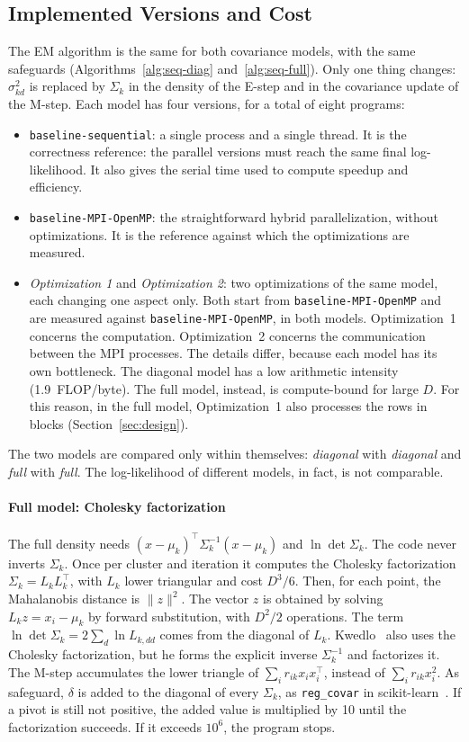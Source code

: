 \documentclass[conference,onecolumn]{IEEEtran}
\newcommand{\vseq}{\texttt{baseline-\allowbreak sequential}}
\newcommand{\vbase}{\texttt{baseline-\allowbreak MPI-\allowbreak OpenMP}}
\begin{document}
\subsection{Implemented Versions and Cost}\label{sec:versions}
The EM algorithm is the same for both covariance models, with the same safeguards (Algorithms~\ref{alg:seq-diag} and~\ref{alg:seq-full}). Only one thing changes: $\sigma^2_{kd}$ is replaced by $\Sigma_k$ in the density of the E-step and in the covariance update of the M-step. Each model has four versions, for a total of eight programs:
\begin{itemize}
\item \vseq{}: a single process and a single thread. It is the correctness reference: the parallel versions must reach the same final log-likelihood. It also gives the serial time used to compute speedup and efficiency.
\item \vbase{}: the straightforward hybrid parallelization, without optimizations. It is the reference against which the optimizations are measured.
\item \emph{Optimization 1} and \emph{Optimization 2}: two optimizations of the same model, each changing one aspect only. Both start from \vbase{} and are measured against \vbase{}, in both models. Optimization~1 concerns the computation. Optimization~2 concerns the communication between the MPI processes. The details differ, because each model has its own bottleneck. The diagonal model has a low arithmetic intensity (1.9~FLOP/byte). The full model, instead, is compute-bound for large $D$. For this reason, in the full model, Optimization~1 also processes the rows in blocks (Section~\ref{sec:design}).
\end{itemize}
The two models are compared only within themselves: \emph{diagonal} with \emph{diagonal} and \emph{full} with \emph{full}. The log-likelihood of different models, in fact, is not comparable.

\paragraph{Full model: Cholesky factorization} The full density needs $(x-\mu_k)^\top\Sigma_k^{-1}(x-\mu_k)$ and $\ln\det\Sigma_k$. The code never inverts $\Sigma_k$. Once per cluster and iteration it computes the Cholesky factorization $\Sigma_k=L_kL_k^\top$, with $L_k$ lower triangular and cost $D^3/6$. Then, for each point, the Mahalanobis distance is $\|z\|^2$. The vector $z$ is obtained by solving $L_kz=x_i-\mu_k$ by forward substitution, with $D^2/2$ operations. The term $\ln\det\Sigma_k=2\sum_d\ln L_{k,dd}$ comes from the diagonal of $L_k$. Kwedlo~\cite{kwedlo} also uses the Cholesky factorization, but he forms the explicit inverse $\Sigma_k^{-1}$ and factorizes it. The M-step accumulates the lower triangle of $\sum_i r_{ik}x_ix_i^\top$, instead of $\sum_i r_{ik}x_i^2$. As safeguard, $\delta$ is added to the diagonal of every $\Sigma_k$, as \texttt{reg\_covar} in scikit-learn~\cite{sklearn}. If a pivot is still not positive, the added value is multiplied by 10 until the factorization succeeds. If it exceeds $10^6$, the program stops.
\end{document}
